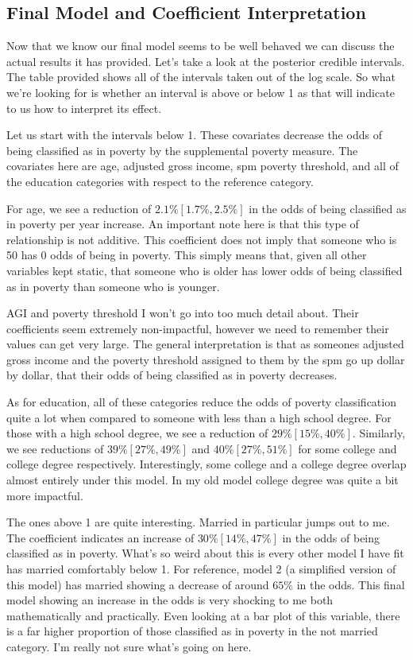 \subsection*{Final Model and Coefficient Interpretation}



Now that we know our final model seems to be well behaved we can discuss the actual results it has provided. Let's take a look at the posterior credible intervals. The table provided shows all of the intervals taken out of the log scale. So what we're looking for is whether an interval is above or below 1 as that will indicate to us how to interpret its effect. 

Let us start with the intervals below 1. These covariates decrease the odds of being classified as in poverty by the supplemental poverty measure. The covariates here are age, adjusted gross income, spm poverty threshold, and all of the education categories with respect to the reference category. 

For age, we see a reduction of $2.1\%[1.7\%, 2.5\%]$ in the odds of being classified as in poverty per year increase. An important note here is that this type of relationship is not additive. This coefficient does not imply that someone who is 50 has 0 odds of being in poverty. This simply means that, given all other variables kept static, that someone who is older has lower odds of being classified as in poverty than someone who is younger.

AGI and poverty threshold I won't go into too much detail about. Their coefficients seem extremely non-impactful, however we need to remember their values can get very large. The general interpretation is that as someones adjusted gross income and the poverty threshold assigned to them by the spm go up dollar by dollar, that their odds of being classified as in poverty decreases. 

As for education, all of these categories reduce the odds of poverty classification quite a lot when compared to someone with less than a high school degree. For those with a high school degree, we see a reduction of $29\%[15\%, 40\%]$. Similarly, we see reductions of $39\%[27\%, 49\%]$ and $40\%[27\%, 51\%]$ for some college and college degree respectively. Interestingly, some college and a college degree overlap almost entirely under this model. In my old model college degree was quite a bit more impactful.

The ones above 1 are quite interesting. Married in particular jumps out to me. The coefficient indicates an increase of $30\%[14\%, 47\%]$ in the odds of being classified as in poverty. What's so weird about this is every other model I have fit has married comfortably below 1. For reference, model 2 (a simplified version of this model) has married showing a decrease of around $65\%$ in the odds. This final model showing an increase in the odds is very shocking to me both mathematically and practically. Even looking at a bar plot of this variable, there is a far higher proportion of those classified as in poverty in the not married category. I'm really not sure what's going on here. 

